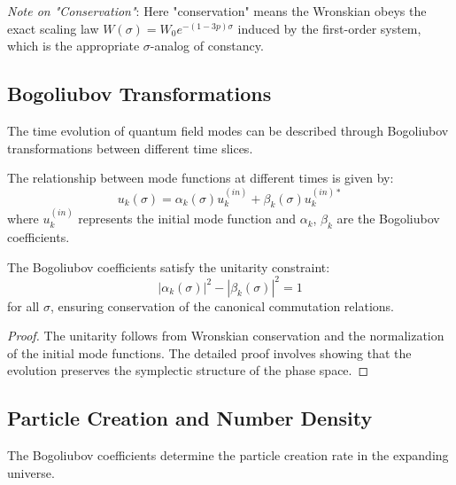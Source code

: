 \emph{Note on "Conservation"}: Here "conservation" means the Wronskian obeys the exact scaling law $W(\sigma) = W_0 e^{-(1-3p)\sigma}$ induced by the first-order system, which is the appropriate $\sigma$-analog of constancy.

\subsection{Bogoliubov Transformations}
\label{subsec:bogoliubov_transformations}

The time evolution of quantum field modes can be described through Bogoliubov transformations between different time slices.

\begin{definition}
The relationship between mode functions at different times is given by:
\begin{equation}
u_k(\sigma) = \alpha_k(\sigma) u_k^{(in)} + \beta_k(\sigma) u_k^{(in)*}
\label{eq:bogoliubov_transformation}
\end{equation}
where $u_k^{(in)}$ represents the initial mode function and $\alpha_k$, $\beta_k$ are the Bogoliubov coefficients.
\end{definition}

\begin{theorem}
\label{thm:bogoliubov_unitarity}
The Bogoliubov coefficients satisfy the unitarity constraint:
\begin{equation}
|\alpha_k(\sigma)|^2 - |\beta_k(\sigma)|^2 = 1
\label{eq:bogoliubov_unitarity}
\end{equation}
for all $\sigma$, ensuring conservation of the canonical commutation relations.
\end{theorem}

\begin{proof}
The unitarity follows from Wronskian conservation and the normalization of the initial mode functions. The detailed proof involves showing that the evolution preserves the symplectic structure of the phase space.
\end{proof}

\subsection{Particle Creation and Number Density}
\label{subsec:particle_creation}

The Bogoliubov coefficients determine the particle creation rate in the expanding universe.


